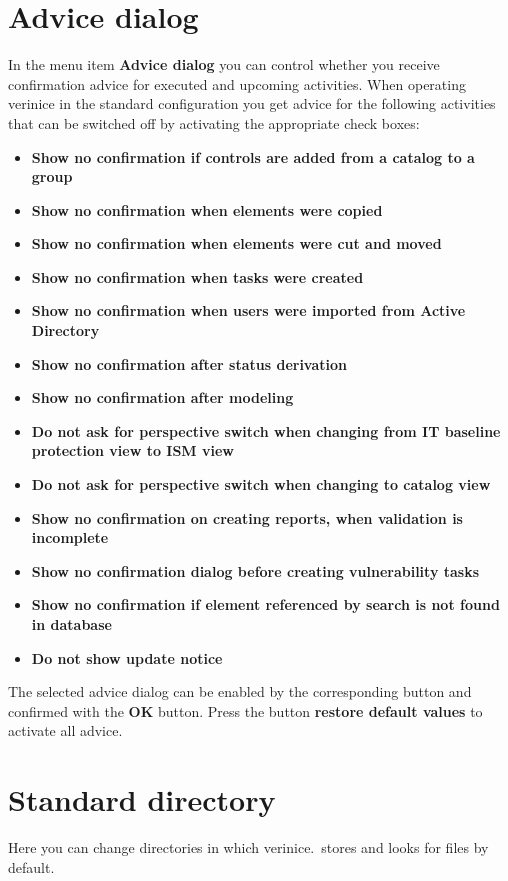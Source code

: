 \documentclass[a4paper,10pt]{book}
\begin{document}
\section{Advice dialog}
In the menu item \textbf{Advice dialog} you can control whether you receive confirmation advice for executed and upcoming activities. When operating verinice in the standard configuration you get advice for the following activities that can be switched off by activating the appropriate check boxes:
\begin{itemize}
 \item \textbf{Show no confirmation if controls are added from a catalog to a group}
 \item \textbf{Show no confirmation when elements were copied}
 \item \textbf{Show no confirmation when elements were cut and moved}
 \item \textbf{Show no confirmation when tasks were created}
 \item \textbf{Show no confirmation when users were imported from Active Directory}
 \item \textbf{Show no confirmation after status derivation}
 \item \textbf{Show no confirmation after modeling}
 \item \textbf{Do not ask for perspective switch when changing from IT baseline protection view to ISM view}
 \item \textbf{Do not ask for perspective switch when changing to catalog view}
 \item \textbf{Show no confirmation on creating reports, when validation is incomplete}
 \item \textbf{Show no confirmation dialog before creating vulnerability tasks}
 \item \textbf{Show no confirmation if element referenced by search is not found in database}
 \item \textbf{Do not show update notice}
\end{itemize}
The selected advice dialog can be enabled by the corresponding button and confirmed with the \textbf{OK} button.
Press the button \textbf{restore default values} to activate all advice.

\section{Standard directory}\label{sec:default_dir}
Here you can change directories in which verinice.\ stores and looks for files
by default.
\end{document}
